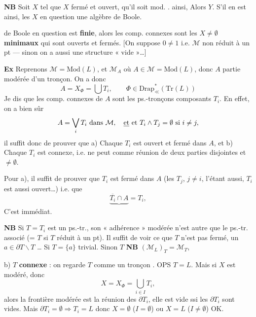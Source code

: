 \documentclass[11pt,a4paper]{article}
\begin{document}
\textbf{NB} Soit $X$ tel que $X$ fermé et ouvert, \ill{} qu'il soit mod. \ill{} \ill{}. \ill{} \ill{} ainsi, Alors  $Y$. S'il en est ainsi, les $X$ en question  une algèbre de Boole. \struck{\ill{}} \struck{\ill{}} \ill{} \ill{} \ill{}

de Boole en question est \textbf{finie}, alors les comp. connexes sont les $X \neq \emptyset$ \textbf{minimaux} qui sont ouverts et fermés. [On suppose $0 \neq 1$ i.e. $\mathcal{M}$ non réduit à un pt — sinon on a  aussi une structure « vide »…]

\textbf{Ex} Reprenons $\mathcal{M} = \mathrm{Mod}(L)$, et $\mathcal{M}_A$ où $A \in \mathcal{M} = \mathrm{Mod}(L)$, donc $A$ partie modérée d'un tronçon. On a donc
\[
  A = X_{\Phi} = \bigcup T_i, \qquad \Phi \in \mathrm{Drap}^{*}_{\ll}(\mathrm{Tr}(L))
\]
Je dis que les comp. connexes de $A$ sont les ps.-tronçons composants $T_i$. En effet, on a bien sûr
\[
  A = \bigvee_i T_i \text{ dans } \mathcal{M}, \quad \struck{\text{et}} \text{ et } T_i \wedge T_j = \emptyset \text{ si } i \neq j,
\]
il suffit donc de prouver que a) Chaque $T_i$ est ouvert et fermé dans $A$, et b) Chaque $T_i$ est connexe, i.e. ne peut  comme réunion  de deux parties \struck{\ill{}} disjointes et  $\neq \emptyset$.

Pour a), il suffit de prouver que $T_i$ est fermé dans \struck{\ill{}} $A$ (les $T_j$, $j \neq i$, l'étant aussi, $T_i$ est aussi ouvert…) \struck{\ill{}} i.e. que
\[
  \underbrace{\overline{T_i} \cap A}_{} = T_i ,
\]
C'est immédiat.

\textbf{NB} Si $T = T_i$ est un ps.-tr., son « adhérence » modérée n'est autre que le ps.-tr.  associé (= $T$ si $T$ réduit à un pt). Il suffit de voir ce que \ill{}  $T$ n'est pas fermé,  un $a \in \partial T \smallsetminus T$ … Si $T = \{a\}$ trivial. Sinon $T$ \ill{} \ill{} \quad \textbf{NB} $(\mathcal{M}_L)_T = \mathcal{M}_T$,

b) $T$ \textbf{connexe} : on regarde $T$ comme un tronçon .  \ill{}  OPS $T = L$. Mais si $X$ est modéré, \struck{\ill{}} donc
\[
  X = X_{\Phi} = \bigcup_{i \in I} T_i ,
\]
alors  la frontière modérée est la réunion des $\partial T_i$, elle est vide ssi les $\partial T_i$ sont vides. Mais $\partial T_i = \emptyset \Longrightarrow T_i = L$ donc $X = \emptyset$ ($I = \emptyset$) ou $X = L$ ($I \neq \emptyset$) OK.
\end{document}
